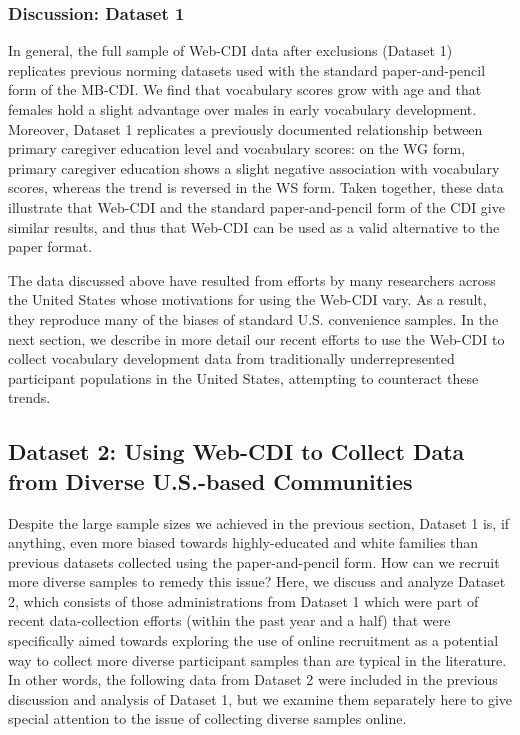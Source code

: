\documentclass[
  english,
  ,man,floatsintext]{apa6}
\begin{document}
\hypertarget{discussion-dataset-1}{%
\subsubsection{Discussion: Dataset 1}\label{discussion-dataset-1}}

In general, the full sample of Web-CDI data after exclusions (Dataset 1) replicates previous norming datasets used with the standard paper-and-pencil form of the MB-CDI. We find that vocabulary scores grow with age and that females hold a slight advantage over males in early vocabulary development. Moreover, Dataset 1 replicates a previously documented relationship between primary caregiver education level and vocabulary scores: on the WG form, primary caregiver education shows a slight negative association with vocabulary scores, whereas the trend is reversed in the WS form. Taken together, these data illustrate that Web-CDI and the standard paper-and-pencil form of the CDI give similar results, and thus that Web-CDI can be used as a valid alternative to the paper format.

The data discussed above have resulted from efforts by many researchers across the United States whose motivations for using the Web-CDI vary. As a result, they reproduce many of the biases of standard U.S. convenience samples. In the next section, we describe in more detail our recent efforts to use the Web-CDI to collect vocabulary development data from traditionally underrepresented participant populations in the United States, attempting to counteract these trends.

\hypertarget{dataset-2-using-web-cdi-to-collect-data-from-diverse-u.s.-based-communities}{%
\subsection{Dataset 2: Using Web-CDI to Collect Data from Diverse U.S.-based Communities}\label{dataset-2-using-web-cdi-to-collect-data-from-diverse-u.s.-based-communities}}

Despite the large sample sizes we achieved in the previous section, Dataset 1 is, if anything, even more biased towards highly-educated and white families than previous datasets collected using the paper-and-pencil form. How can we recruit more diverse samples to remedy this issue? Here, we discuss and analyze Dataset 2, which consists of those administrations from Dataset 1 which were part of recent data-collection efforts (within the past year and a half) that were specifically aimed towards exploring the use of online recruitment as a potential way to collect more diverse participant samples than are typical in the literature. In other words, the following data from Dataset 2 were included in the previous discussion and analysis of Dataset 1, but we examine them separately here to give special attention to the issue of collecting diverse samples online.
\end{document}
